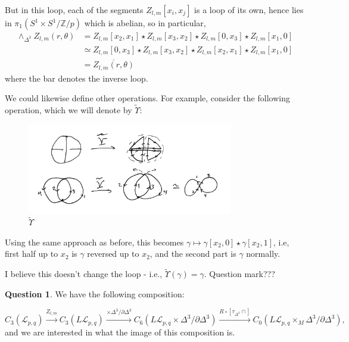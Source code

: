 \documentclass[reqno]{amsart}
\theoremstyle{definition}
\newtheorem{question}[theorem]{Question}
\theoremstyle{remark}
\begin{document}
But in this loop, each of the segments
$Z_{l,m}[x_i, x_j]$ is a loop of its own, hence
lies in
$\pi_1\left( S^{1} \times S^{1} / \mathbb{Z}/p \right) $ which is
abelian, so in particular,
\begin{align*}
    \wedge_{\Delta^3} Z_{l,m}(r, \theta)
    &=
    Z_{l,m}[x_2,x_1] \star Z_{l,m}[x_3,x_2] 
    \star Z_{l,m}[0,x_3] \star
    Z_{l,m}[x_1,0]\\
    &\simeq 
    Z_{l,m}[0,x_3] \star Z_{l,m} [x_3, x_2] \star
    Z_{l,m}[x_2,x_1] \star Z_{l,m}[x_1,0]\\
    &=
    \overline{ Z_{l,m} (r , \theta)}
\end{align*}
where the bar denotes the inverse loop.


We could likewise define other operations. For example, consider the
following operation, which we will denote by
$\tilde{\Upsilon}$:

\begin{figure}[htpb]
    \centering
    \includegraphics[width=0.8\textwidth]{Figures/NUIZKUW.jpeg}
    \caption{$\tilde{\Upsilon}$}
    \label{fig:Figures-NUIZKUW-jpeg}
\end{figure}

Using the same approach as before, this becomes
$\gamma \mapsto \gamma[x_2,0] \star \gamma[x_2, 1]$, i.e,
first half up to $x_2$ is $\gamma$ reversed up to
$x_2$, and the second part is $\gamma$ normally.

I believe this doesn't change the loop - i.e., 
$\tilde{\Upsilon} \left( \gamma \right) = \gamma$. Question mark???


\begin{question}
    We have the following composition:

    \[
    C_{3}(\mathcal{L}_{p,q})
    \stackrel{Z_{l,m}}{\to} 
    C_3 \left( L \mathcal{L}_{p,q} \right) 
    \stackrel{\times \Delta^3 / \partial \Delta^3}{\to} 
    C_{6}\left( L \mathcal{L}_{p,q} \times 
    \Delta^3 / \partial \Delta^3 \right) 
    \stackrel{R \circ \left[ \tau_{\Delta^3}\cap \right] }{\to} 
    C_{0} \left( L \mathcal{L}_{p,q} \times_M 
    \Delta^3 / \partial \Delta^3 \right),
    \] 
    and we are interested in what the image of this composition is.
\end{question}
\end{document}
